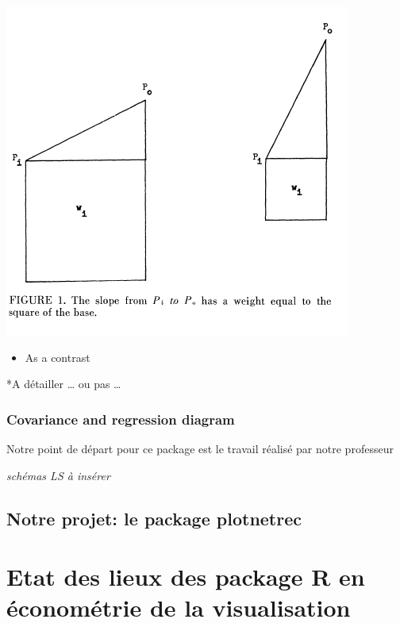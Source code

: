 \documentclass[
]{report}
\providecommand{\tightlist}{%
  \setlength{\itemsep}{0pt}\setlength{\parskip}{0pt}}
\begin{document}
\includegraphics{LI_slope.PNG}

\begin{itemize}
\tightlist
\item
  As a contrast
\end{itemize}

*A détailler \ldots{} ou pas \ldots{}

\hypertarget{covariance-and-regression-diagram-1}{%
\subsection{Covariance and regression diagram}\label{covariance-and-regression-diagram-1}}

Notre point de départ pour ce package est le travail réalisé par notre professeur \citep{bousquet}

\emph{schémas LS à insérer}

\hypertarget{notre-projet-le-package-plotnetrec-1}{%
\section{Notre projet: le package plotnetrec}\label{notre-projet-le-package-plotnetrec-1}}

\hypertarget{etat-des-lieux-des-package-r-en-uxe9conomuxe9trie-de-la-visualisation}{%
\chapter{Etat des lieux des package R en économétrie de la visualisation}\label{etat-des-lieux-des-package-r-en-uxe9conomuxe9trie-de-la-visualisation}}
\end{document}
